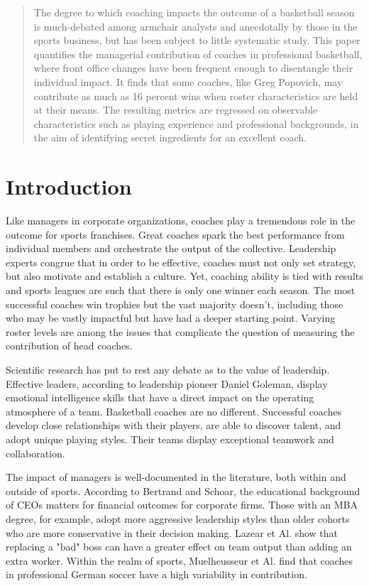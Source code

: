 \documentclass[main.tex]{subfiles}
\begin{document}
\begin{abstract}

The degree to which coaching impacts the outcome of a basketball season is much-debated
among armchair analysts and anecdotally by those in the sports business, but has been subject
to little systematic study. This paper quantifies the managerial contribution of coaches in professional basketball, where front office changes have been frequent enough to disentangle their individual impact. It finds that some coaches, like Greg Popovich, may contribute as much as 16 percent wins when roster characteristics are held at their means. The resulting metrics are regressed on observable characteristics such as playing experience and professional backgrounds, in the aim of identifying secret ingredients for an excellent coach. 

\end{abstract}

\section{Introduction}


Like managers in corporate organizations, coaches play a tremendous role in the outcome for sports franchises. Great coaches spark the best performance from individual members and orchestrate the output of the collective. Leadership experts congrue that in order to be effective, coaches must not only set strategy, but also motivate and establish a culture. Yet, coaching ability is tied with results and sports leagues are such that there is only one winner each season. The most successful coaches win trophies but the vast majority doesn't, including those who may be vastly impactful but have had a deeper starting point. Varying roster levels are among the issues that complicate the question of measuring the contribution of head coaches. 

Scientific research has put to rest any debate as to the value of leadership. Effective leaders, according to leadership pioneer Daniel Goleman, display emotional intelligence skills that have a direct impact on the operating atmosphere of a team. Basketball coaches are no different. Successful coaches develop close relationships with their players, are able to discover talent, and adopt unique playing styles. Their teams display exceptional teamwork and collaboration.

The impact of managers is well-documented in the literature, both within and outside of sports. According to Bertrand and Schoar, the educational background of CEOs matters for financial outcomes for corporate firms. Those with an MBA degree, for example, adopt more aggressive leadership styles than older cohorts who are more conservative in their decision making. Lazear et Al. show that replacing a "bad" boss can have a greater effect on team output than adding an extra worker. Within the realm of sports, Muelheusseur et Al. find that coaches in professional German soccer have a high variability in contribution. 
\end{document}
